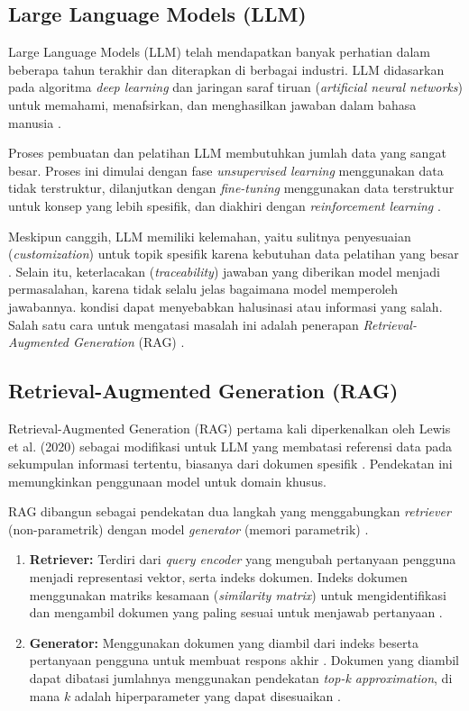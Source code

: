 \subsection{Large Language Models (LLM)}
Large Language Models (LLM) telah mendapatkan banyak perhatian dalam beberapa tahun terakhir dan diterapkan di berbagai industri. LLM didasarkan pada algoritma \textit{deep learning} dan jaringan saraf tiruan (\textit{artificial neural networks}) untuk memahami, menafsirkan, dan menghasilkan jawaban dalam bahasa manusia \cite{Steininger2025}.

Proses pembuatan dan pelatihan LLM membutuhkan jumlah data yang sangat besar. Proses ini dimulai dengan fase \textit{unsupervised learning} menggunakan data tidak terstruktur, dilanjutkan dengan \textit{fine-tuning} menggunakan data terstruktur untuk konsep yang lebih spesifik, dan diakhiri dengan \textit{reinforcement learning} \cite{Steininger2025}.

Meskipun canggih, LLM memiliki kelemahan, yaitu sulitnya penyesuaian (\textit{customization}) untuk topik spesifik karena kebutuhan data pelatihan yang besar \cite{Steininger2025}. Selain itu, keterlacakan (\textit{traceability}) jawaban yang diberikan model menjadi permasalahan, karena tidak selalu jelas bagaimana model memperoleh jawabannya. 
kondisi dapat menyebabkan halusinasi atau informasi yang salah. Salah satu cara untuk mengatasi masalah ini adalah penerapan \textit{Retrieval-Augmented Generation} (RAG) \cite{Steininger2025}.

\subsection{Retrieval-Augmented Generation (RAG)}
Retrieval-Augmented Generation (RAG) pertama kali diperkenalkan oleh Lewis et al. (2020) sebagai modifikasi untuk LLM yang membatasi referensi data pada sekumpulan informasi tertentu, biasanya dari dokumen spesifik \cite{Steininger2025}. Pendekatan ini memungkinkan penggunaan model untuk domain khusus.

RAG dibangun sebagai pendekatan dua langkah yang menggabungkan \textit{retriever} (non-parametrik) dengan model \textit{generator} (memori parametrik) \cite{Steininger2025}.
\begin{enumerate}
    \item \textbf{Retriever:} Terdiri dari \textit{query encoder} yang mengubah pertanyaan pengguna menjadi representasi vektor, serta indeks dokumen. Indeks dokumen menggunakan matriks kesamaan (\textit{similarity matrix}) untuk mengidentifikasi dan mengambil dokumen yang paling sesuai untuk menjawab pertanyaan \cite{Steininger2025}.
    \item \textbf{Generator:} Menggunakan dokumen yang diambil dari indeks beserta pertanyaan pengguna untuk membuat respons akhir \cite{Steininger2025}. Dokumen yang diambil dapat dibatasi jumlahnya menggunakan pendekatan \textit{top-k approximation}, di mana $k$ adalah hiperparameter yang dapat disesuaikan \cite{Steininger2025}.
\end{enumerate}

